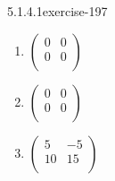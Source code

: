 \documentclass[twoside,10pt,]{book}
\numberwithin{equation}{section}
\begin{document}
\begin{divisionsolution}{5.1.4.1}{}{exercise-197}
\begin{enumerate}[label=(\alph*)]
\(B+0=B\)%
\item\hypertarget{li-923}{}\hypertarget{p-1754}{}%
\(\left(
\begin{array}{cc}
0 & 0 \\
0 & 0 \\
\end{array}
\right)\)%
\item\hypertarget{li-924}{}\hypertarget{p-1755}{}%
\(\left(
\begin{array}{cc}
0 & 0 \\
0 & 0 \\
\end{array}
\right)\)%
\item\hypertarget{li-925}{}\hypertarget{p-1756}{}%
\(\left(
\begin{array}{cc}
5 & -5 \\
10 & 15 \\
\end{array}
\right)\)%
\end{enumerate}
%
\end{divisionsolution}%
\end{document}
